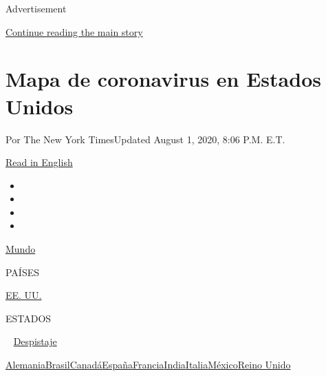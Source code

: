 Advertisement

\protect\hyperlink{after-top}{Continue reading the main story}

\hypertarget{mapa-de-coronavirus-en-estados-unidos}{%
\section{Mapa de coronavirus en Estados
Unidos}\label{mapa-de-coronavirus-en-estados-unidos}}

Por The New York TimesUpdated August 1, 2020, 8:06 P.M. E.T.

\href{https://www.nytimes.com/interactive/2020/us/coronavirus-us-cases.html}{Read
in English}

\begin{itemize}
\item
\item
\item
\item
\end{itemize}

\href{https://www.nytimes.com/interactive/2020/world/coronavirus-maps.html}{Mundo}~

PAÍSES

\textbar{}
\href{https://www.nytimes.com/es/interactive/2020/espanol/mundo/coronavirus-en-estados-unidos.html}{EE.
UU.}~

ESTADOS

~
\href{https://www.nytimes.com/interactive/2020/us/coronavirus-testing.html}{Despistaje}

\href{https://www.nytimes.com/interactive/2020/world/europe/germany-coronavirus-cases.html}{Alemania}\href{https://www.nytimes.com/interactive/2020/world/americas/brazil-coronavirus-cases.html}{Brasil}\href{https://www.nytimes.com/interactive/2020/world/canada/canada-coronavirus-cases.html}{Canadá}\href{https://www.nytimes.com/interactive/2020/world/europe/spain-coronavirus-cases.html}{España}\href{https://www.nytimes.com/interactive/2020/world/europe/france-coronavirus-cases.html}{Francia}\href{https://www.nytimes.com/interactive/2020/world/asia/india-coronavirus-cases.html}{India}\href{https://www.nytimes.com/interactive/2020/world/europe/italy-coronavirus-cases.html}{Italia}\href{https://www.nytimes.com/es/interactive/2020/espanol/america-latina/coronavirus-en-mexico.html}{México}\href{https://www.nytimes.com/interactive/2020/world/europe/united-kingdom-coronavirus-cases.html}{Reino
Unido}

